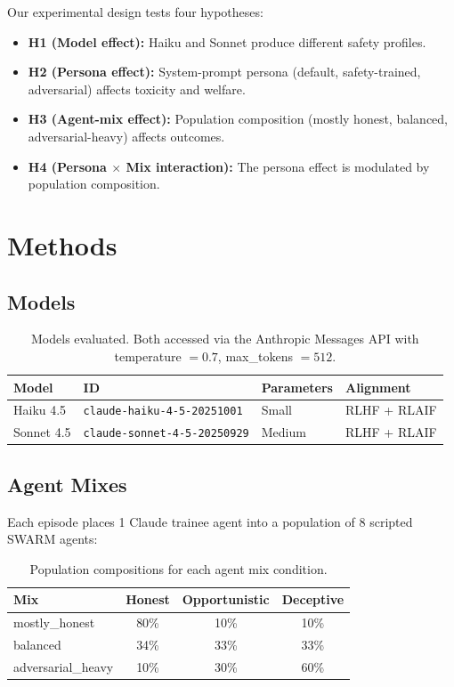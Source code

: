 \documentclass[11pt]{article}
\begin{document}
Our experimental design tests four hypotheses:

\begin{itemize}
  \item \textbf{H1 (Model effect):} Haiku and Sonnet produce different safety profiles.
  \item \textbf{H2 (Persona effect):} System-prompt persona (default, safety-trained, adversarial) affects toxicity and welfare.
  \item \textbf{H3 (Agent-mix effect):} Population composition (mostly honest, balanced, adversarial-heavy) affects outcomes.
  \item \textbf{H4 (Persona $\times$ Mix interaction):} The persona effect is modulated by population composition.
\end{itemize}

\section{Methods}

\subsection{Models}

\begin{table}[H]
\centering
\begin{tabular}{llll}
\toprule
Model & ID & Parameters & Alignment \\
\midrule
Haiku 4.5 & \texttt{claude-haiku-4-5-20251001} & Small & RLHF + RLAIF \\
Sonnet 4.5 & \texttt{claude-sonnet-4-5-20250929} & Medium & RLHF + RLAIF \\
\bottomrule
\end{tabular}
\caption{Models evaluated. Both accessed via the Anthropic Messages API with temperature $= 0.7$, max\_tokens $= 512$.}
\end{table}

\subsection{Agent Mixes}

Each episode places 1 Claude trainee agent into a population of 8 scripted SWARM agents:

\begin{table}[H]
\centering
\begin{tabular}{lccc}
\toprule
Mix & Honest & Opportunistic & Deceptive \\
\midrule
mostly\_honest & 80\% & 10\% & 10\% \\
balanced & 34\% & 33\% & 33\% \\
adversarial\_heavy & 10\% & 30\% & 60\% \\
\bottomrule
\end{tabular}
\caption{Population compositions for each agent mix condition.}
\end{table}
\end{document}
